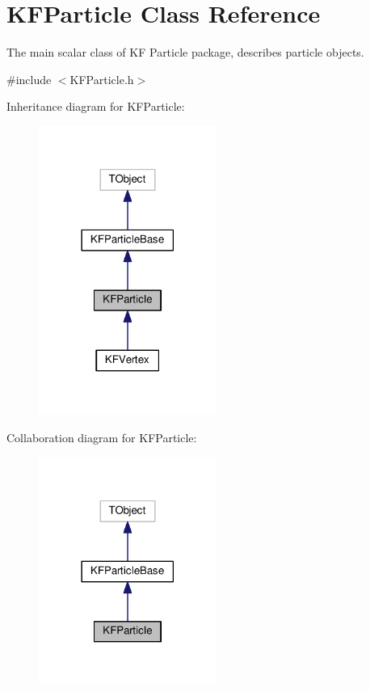 \hypertarget{classKFParticle}{}\section{K\+F\+Particle Class Reference}
\label{classKFParticle}


The main scalar class of KF Particle package, describes particle objects.  




{\ttfamily \#include $<$K\+F\+Particle.\+h$>$}



Inheritance diagram for K\+F\+Particle\+:\nopagebreak
\begin{figure}[H]
\begin{center}
\leavevmode
\includegraphics[width=165pt]{classKFParticle__inherit__graph}
\end{center}
\end{figure}


Collaboration diagram for K\+F\+Particle\+:\nopagebreak
\begin{figure}[H]
\begin{center}
\leavevmode
\includegraphics[width=165pt]{classKFParticle__coll__graph}
\end{center}
\end{figure}
